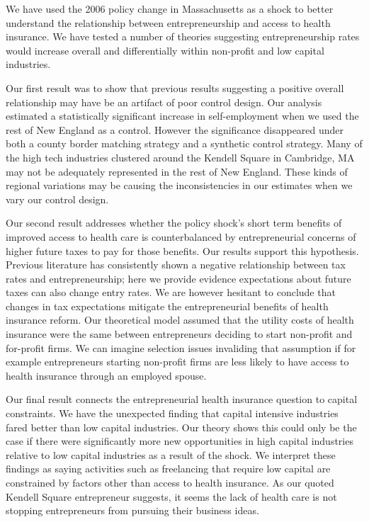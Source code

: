 \documentclass[12pt]{article}
\begin{document}
We have used the 2006 policy change in Massachusetts as a shock to better understand the relationship between entrepreneurship and access to health insurance. We have tested a number of theories suggesting entrepreneurship rates would increase overall and differentially within non-profit and low capital industries. 

Our first result was to show that previous results suggesting a positive overall relationship may have be an artifact of poor control design. Our analysis estimated a statistically significant increase in self-employment when we used the rest of New England as a control. However the significance disappeared under both a county border matching strategy and a synthetic control strategy. Many of the high tech industries clustered around the Kendell Square in Cambridge, MA may not be adequately represented in the rest of New England. These kinds of regional variations may be causing the inconsistencies in our estimates when we vary our control design. 

Our second result addresses whether the policy shock's short term benefits of improved access to health care is counterbalanced by entrepreneurial concerns of higher future taxes to pay for those benefits. Our results support this hypothesis. Previous literature  has consistently shown a negative relationship between tax rates and entrepreneurship; here we provide evidence expectations about future taxes can also change entry rates. We are however hesitant to conclude that changes in tax expectations mitigate the entrepreneurial benefits of health insurance reform. Our theoretical model assumed that the utility costs of health insurance were the same between entrepreneurs deciding to start non-profit and for-profit firms. We can imagine selection issues invaliding that assumption if for example entrepreneurs starting non-profit firms are less likely to have access to health insurance through an employed spouse. 

Our final result connects the entrepreneurial health insurance question to capital constraints. We have the unexpected finding that capital intensive industries fared better than low capital industries. Our theory shows this could only be the case if there were significantly more new opportunities in high capital industries relative to low capital industries as a result of the shock. We interpret these findings as saying activities such as freelancing that require low capital are constrained by factors other than access to health insurance. As our quoted Kendell Square entrepreneur suggests, it seems the lack of health care is not stopping entrepreneurs from pursuing their business ideas. 
\end{document}
